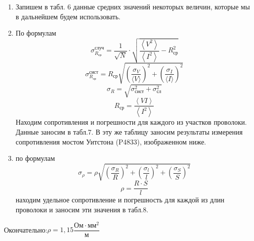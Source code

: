 \documentclass[a4paper, 10pt]{article}%
\begin{document}
\begin{enumerate}
\item Запишем в табл. 6 данные средних значений некоторых величин, которые мы в дальнейшем будем использовать.
\item По формулам 
\[ \sigma^{\text{случ}}_{R_{\text{ср}}} = \dfrac{1}{\sqrt{N}}\cdot \sqrt{\dfrac{\left\langle V^2 \right\rangle }{\left\langle I^2 \right\rangle} - R^{2}_{\text{ср}}}\] 
\[ \sigma^{\text{сист}}_{R_{\text{ср}}} = R_{\text{ср}}\sqrt{\left( \dfrac{\sigma_{V}}{\langle V\rangle} \right) ^{2} + \left( \dfrac{\sigma_{I}}{\langle I\rangle} \right) ^{2} } \]
\[ \sigma_R =  \sqrt{\sigma_{\text{сист}}^2 + \sigma_{\text{сл}}^2} \]
\[ R_\text{ср} = \dfrac{\left\langle VI \right\rangle}{\left\langle I^2 \right\rangle}\]
Находим сопротивления и погрешности для каждого из участков проволоки. Данные заносим в табл.7. В эту же таблицу заносим результаты измерения сопротивления мостом Уитстона (P4833), изображенном ниже.
\begin{figure}[h]
\end{figure}
\item по формулам 
\[ \sigma_{\rho} = \rho \sqrt{\left( \dfrac{\sigma_{R}}{R} \right) ^{2} + \left( \dfrac{\sigma_{l}}{l} \right) ^{2} + \left( \dfrac{\sigma_{S}}{S} \right) ^{2} } \]
\[\rho = \dfrac{R \cdot S}{l}\]
находим удельное сопротивление и погрешность для каждой из длин проволоки и заносим эти значения в табл.8.
\end{enumerate}
Окончательно:$\rho = 1,15 \dfrac{\text{Ом} \cdot \text{мм}^2}{\text{м}}$
\end{document}
